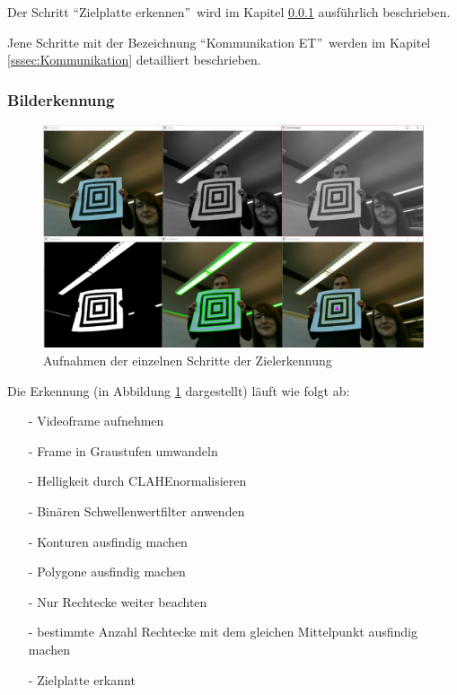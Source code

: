 \documentclass[a4paper]{report}
\begin{document}
Der Schritt \textquotedblleft Zielplatte erkennen\textquotedblright\ wird im Kapitel \ref{sssec:Bilderkennung} ausführlich beschrieben.

Jene Schritte mit der Bezeichnung \textquotedblleft Kommunikation ET\textquotedblright\ werden im Kapitel \ref{sssec:Kommunikation} detailliert beschrieben.

\subsubsection{Bilderkennung}
\label{sssec:Bilderkennung}

\begin{figure}[h!]
	\centering
	\includegraphics[keepaspectratio,width=\textwidth]{BilderkennungAblauf}
	\caption{Aufnahmen der einzelnen Schritte der Zielerkennung}
	\label{fig:AufnahmeZielerkennung}
\end{figure}

Die Erkennung (in Abbildung \ref{fig:AufnahmeZielerkennung} dargestellt) läuft wie folgt ab:

\begin{itemize}[noitemsep]
	\item[-] Videoframe aufnehmen
	\item[-] Frame in Graustufen umwandeln
	\item[-] Helligkeit durch CLAHE\footnotemark normalisieren
	\item[-] Binären Schwellenwertfilter anwenden
	\item[-] Konturen ausfindig machen
	\item[-] Polygone ausfindig machen
	\item[-] Nur Rechtecke weiter beachten
	\item[-] bestimmte Anzahl Rechtecke mit dem gleichen Mittelpunkt ausfindig machen
	\item[-] Zielplatte erkannt
\end{itemize}
\end{document}
